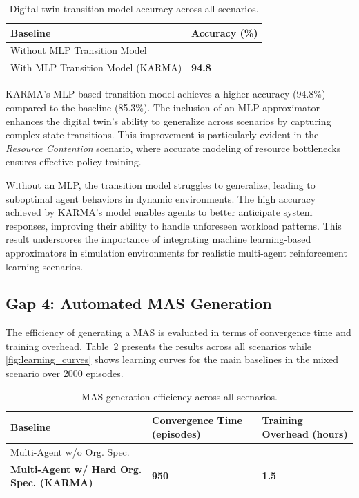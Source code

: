 \documentclass[conference]{IEEEtran}
\begin{document}
\begin{table}[h]
    \centering
    \caption{Digital twin transition model accuracy across all scenarios.}
    \label{tab:digital_twin_accuracy}{
        \footnotesize
    \begin{tabular}{>{\raggedright\arraybackslash}m{6cm}>{\centering\arraybackslash}m{2cm}}
        \hline
        \textbf{Baseline} & \textbf{Accuracy (\%)} \\
        \hline
        Without MLP Transition Model & 85.3 \\
        With MLP Transition Model (KARMA) & \textbf{94.8} \\
        \hline
    \end{tabular}}
\end{table}

KARMA's MLP-based transition model achieves a higher accuracy (94.8\%) compared to the baseline (85.3\%). The inclusion of an MLP approximator enhances the digital twin's ability to generalize across scenarios by capturing complex state transitions. This improvement is particularly evident in the \textit{Resource Contention} scenario, where accurate modeling of resource bottlenecks ensures effective policy training.

Without an MLP, the transition model struggles to generalize, leading to suboptimal agent behaviors in dynamic environments. The high accuracy achieved by KARMA's model enables agents to better anticipate system responses, improving their ability to handle unforeseen workload patterns. This result underscores the importance of integrating machine learning-based approximators in simulation environments for realistic multi-agent reinforcement learning scenarios.


\subsection{Gap 4: Automated MAS Generation}

The efficiency of generating a MAS is evaluated in terms of convergence time and training overhead. Table~\ref{tab:mas_generation_efficiency} presents the results across all scenarios while \autoref{fig:learning_curves} shows learning curves for the main baselines in the mixed scenario over 2000 episodes.

\begin{table}[h]
    \centering
    \caption{MAS generation efficiency across all scenarios.}
    \label{tab:mas_generation_efficiency}{
        \footnotesize
    \begin{tabular}{>{\raggedright\arraybackslash}m{3.5cm}>{\centering\arraybackslash}m{2cm}>{\centering\arraybackslash}m{2cm}}
        \hline
        \textbf{Baseline} & \textbf{Convergence Time (episodes)} & \textbf{Training Overhead (hours)} \\
        \hline
        Multi-Agent w/o Org. Spec. & 1800 & 4 \\
        \textbf{Multi-Agent w/ Hard Org. Spec. (KARMA)} & \textbf{950} & \textbf{1.5} \\
        \hline
    \end{tabular}}
\end{table}
\end{document}
